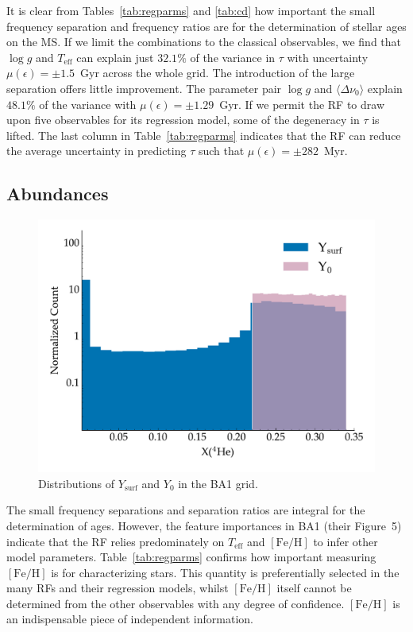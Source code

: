 It is clear from Tables~\ref{tab:regparms} and \ref{tab:cd}  how important the small frequency separation and frequency ratios are for the determination of stellar ages on the MS. 
If we limit the combinations to the classical observables, we find that  ${\log{} g}$ and $T_{\text{eff}}$ can explain just $32.1\%$ of the variance in $\tau$ with uncertainty ${\mu (\epsilon) = \pm 1.5}$~Gyr across the whole grid. The introduction of the large separation offers little improvement. The parameter pair ${\log{} g}$ and ${\langle\Delta\nu_0\rangle}$  explain $48.1\%$ of the variance with  ${\mu (\epsilon) = \pm 1.29}$~Gyr.
If we permit the RF to draw upon five observables for its regression model, some of the degeneracy in $\tau$ is lifted.  The last column in Table~\ref{tab:regparms}
indicates that the RF can reduce the average uncertainty in predicting  $\tau$ such that  ${\mu (\epsilon) =\pm 282}$~Myr.

\subsection{Abundances}
\begin{figure}
    \centering
    \includegraphics[width=0.9\linewidth]{hehist2.pdf}
    \caption[Distributions of initial and surface helium abundances in the generated stellar models]{Distributions of $Y_{\text{surf}}$ and $Y_0$ in the BA1 grid.}
    \label{fig:Hehist}
\end{figure}
The small frequency separations and separation ratios are integral for the determination of ages. 
However, the feature importances in BA1 (their Figure~5) indicate that the RF relies predominately on  $T_{\text{eff}}$ and $[\text{Fe/H}]$ to infer other model parameters. 
Table~\ref{tab:regparms} confirms how important measuring $[\text{Fe/H}]$ is for characterizing stars. This quantity is preferentially selected in the many RFs and their regression models, whilst $[\text{Fe/H}]$ itself cannot be determined from the other observables with any degree of confidence.   
$[\text{Fe/H}]$ is an indispensable piece of independent information.

